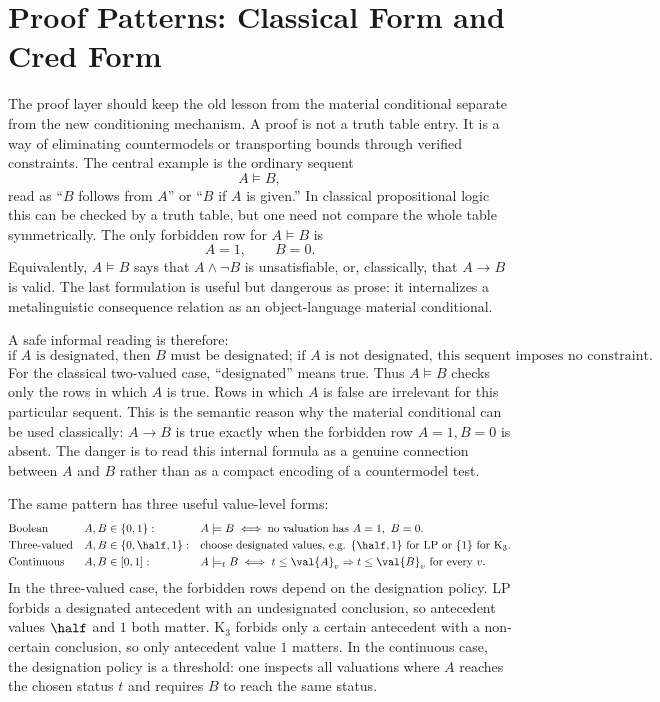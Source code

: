 \section{Proof Patterns: Classical Form and Cred Form}
\label{sec:proof-patterns}

The proof layer should keep the old lesson from the material
conditional separate from the new conditioning mechanism.  A proof is
not a truth table entry.  It is a way of eliminating countermodels or
transporting bounds through verified constraints.  The central example
is the ordinary sequent
\[
  A\models B,
\]
read as ``$B$ follows from $A$'' or ``$B$ if $A$ is given.''  In
classical propositional logic this can be checked by a truth table, but
one need not compare the whole table symmetrically.  The only forbidden
row for $A\models B$ is
\[
  A=1,\qquad B=0.
\]
Equivalently, $A\models B$ says that $A\land\neg B$ is unsatisfiable,
or, classically, that $A\to B$ is valid.  The last formulation is useful
but dangerous as prose: it internalizes a metalinguistic consequence
relation as an object-language material conditional.

A safe informal reading is therefore:
\[
\boxed{\text{if $A$ is designated, then $B$ must be designated;
if $A$ is not designated, this sequent imposes no constraint.}}
\]
For the classical two-valued case, ``designated'' means true.  Thus
$A\models B$ checks only the rows in which $A$ is true.  Rows in which
$A$ is false are irrelevant for this particular sequent.  This is the
semantic reason why the material conditional can be used classically:
$A\to B$ is true exactly when the forbidden row $A=1,B=0$ is absent.
The danger is to read this internal formula as a genuine connection
between $A$ and $B$ rather than as a compact encoding of a countermodel
test.

The same pattern has three useful value-level forms:
\[
\begin{array}{@{}lll@{}}
\text{Boolean} & A,B\in\{0,1\}: & A\models B\iff
  \text{no valuation has }A=1,\ B=0.\\[1mm]
\text{Three-valued} & A,B\in\{0,\half,1\}: &
  \text{choose designated values, e.g. }\{\half,1\}\text{ for LP or }\{1\}\text{ for K}_3.\\[1mm]
\text{Continuous} & A,B\in[0,1]: & A\models_t B\iff
  t\le\val{A}_v\Rightarrow t\le\val{B}_v\text{ for every }v.
\end{array}
\]
In the three-valued case, the forbidden rows depend on the designation
policy.  LP forbids a designated antecedent with an undesignated
conclusion, so antecedent values $\half$ and $1$ both matter.  K$_3$
forbids only a certain antecedent with a non-certain conclusion, so only
antecedent value $1$ matters.  In the continuous case, the designation
policy is a threshold: one inspects all valuations where $A$ reaches the
chosen status $t$ and requires $B$ to reach the same status.

